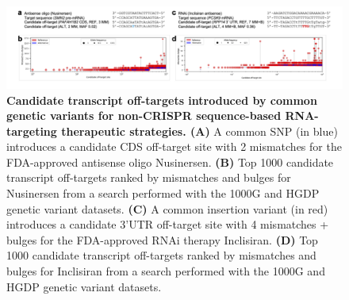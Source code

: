 \documentclass[a4paper, titlepage, openright]{book}
\begin{document}
\begin{figure}
	\centering
	\includegraphics[width=\textwidth]{figures/crisprme9.png}
	\caption[Candidate transcript off-targets introduced by common genetic variants for non-CRISPR sequence-based RNA-targeting therapeutic strategies]{\textbf{Candidate transcript off-targets introduced by common genetic variants for non-CRISPR sequence-based RNA-targeting therapeutic strategies. (A)} A common SNP (in blue) introduces a candidate CDS off-target site with 2 mismatches for the FDA-approved antisense oligo Nusinersen. \textbf{(B)} Top 1000 candidate transcript off-targets ranked by mismatches and bulges for Nusinersen from a search performed with the 1000G and HGDP genetic variant datasets. \textbf{(C)} A common insertion variant (in red) introduces a candidate 3’UTR off-target site with 4 mismatches + bulges for the FDA-approved RNAi therapy Inclisiran. \textbf{(D)} Top 1000 candidate transcript off-targets ranked by mismatches and bulges for Inclisiran from a search performed with the 1000G and HGDP genetic variant datasets.}
	\label{fig:crisprme9}
\end{figure} 
\end{document}
